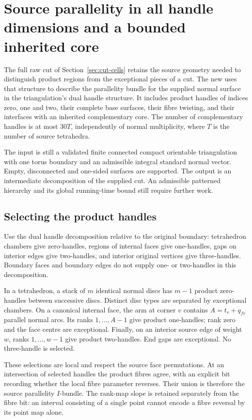 \section{Source parallelity in all handle dimensions and a bounded inherited core}
\label{sec:parallelity-core}

The full raw cut of Section~\ref{sec:cut-cells} retains the source geometry
needed to distinguish product regions from the exceptional pieces of a cut.
The new  uses that structure to describe the
parallelity bundle for the supplied normal surface in the triangulation's
dual handle structure. It includes product handles of indices zero, one and
two, their complete base surfaces, their fibre twisting, and their interfaces
with an inherited complementary core. The number of complementary handles
is at most $30T$, independently of normal multiplicity, where $T$ is the
number of source tetrahedra.

The input is still a validated finite connected compact orientable
triangulation with one torus boundary and an admissible integral standard
normal vector. Empty, disconnected and one-sided surfaces are supported.
The output is an intermediate decomposition of the supplied cut. An
admissible patterned hierarchy and its global running-time bound still
require further work.

\subsection{Selecting the product handles}

Use the dual handle decomposition relative to the original boundary:
tetrahedron chambers give zero-handles, regions of internal faces give
one-handles, gaps on interior edges give two-handles, and interior original
vertices give three-handles. Boundary faces and boundary edges do not supply
one- or two-handles in this decomposition.

In a tetrahedron, a stack of $m$ identical normal discs has $m-1$ product
zero-handles between successive discs. Distinct disc types are separated by
exceptional chambers. On a canonical internal face, the arm at corner $v$
contains $A=t_v+q_{fv}$ parallel normal arcs. Its ranks $1,\ldots,A-1$ give
product one-handles; rank zero and the face centre are exceptional. Finally,
on an interior source edge of weight $w$, ranks $1,\ldots,w-1$ give product
two-handles. End gaps are exceptional. No three-handle is selected.

These selections are local and respect the source face permutations. At an
intersection of selected handles the product fibres agree, with an explicit
bit recording whether the local fibre parameter reverses. Their union is
therefore the source parallelity $I$-bundle. The rank-map slope is retained
separately from the fibre bit: an interval consisting of a single point
cannot encode a fibre reversal by its point map alone.

